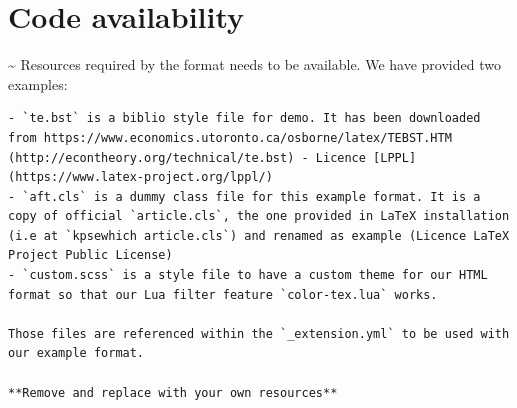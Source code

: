\documentclass[fleqn,10pt]{wlscirep}
\begin{document}
\hypertarget{code-availability-1}{%
\section{Code availability}\label{code-availability-1}}

\textasciitilde{} Resources required by the format needs to be
available. We have provided two examples:

\begin{verbatim}
- `te.bst` is a biblio style file for demo. It has been downloaded from https://www.economics.utoronto.ca/osborne/latex/TEBST.HTM (http://econtheory.org/technical/te.bst) - Licence [LPPL](https://www.latex-project.org/lppl/)
- `aft.cls` is a dummy class file for this example format. It is a copy of official `article.cls`, the one provided in LaTeX installation (i.e at `kpsewhich article.cls`) and renamed as example (Licence LaTeX Project Public License)
- `custom.scss` is a style file to have a custom theme for our HTML format so that our Lua filter feature `color-tex.lua` works.

Those files are referenced within the `_extension.yml` to be used with our example format.

**Remove and replace with your own resources**
\end{verbatim}
\end{document}
